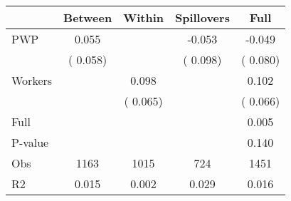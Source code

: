 
\begin{tabular}{l*{4}{c}}\hline&\multicolumn{1}{c}{Between}&\multicolumn{1}{c}{Within}&\multicolumn{1}{c}{Spillovers}&\multicolumn{1}{c}{Full}\\ \hline
 PWP           &              0.055      &                                               &       -0.053 &        -0.049                            \\ 
                               &        (       0.058)           &                                       &       (       0.098)     &      (       0.080)                                           \\ 
 Workers       &                                               &        0.098    &                                &             0.102                            \\ 
                               &                                               & (       0.065)                  &                                        &      (       0.066)                                           \\ 
\hline                                                                                                                                                                                                                                            
 Full                  &                                               &                                               &                                        &             0.005                                     \\ 
 P-value               &                                               &                                               &                                        &             0.140                                           \\ 
 Obs                   &               1163               &       1015                       &       724                &              1451                                               \\ 
 R2                    &                      0.015              &              0.002                      &              0.029               &                     0.016                                              \\ 
\hline \end{tabular}                                                                                                                                                                                                              